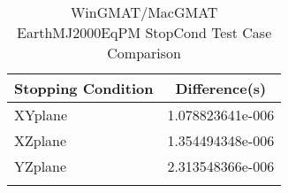 \begin{table}[htbp!]
\centering
\caption{ WinGMAT/MacGMAT EarthMJ2000EqPM StopCond Test Case Comparison}
      \begin{tabular}{lc}
      \hline\hline
          Stopping Condition & Difference(s) \\
         \hline
         XYplane & 1.078823641e-006 \\
         XZplane & 1.354494348e-006 \\
         YZplane & 2.313548366e-006 \\
      \hline\hline
      \label{Table: WinGMAT-MacGMAT EarthMJ2000EqPM StopCond Table} 
\end{tabular}
\end{table}
